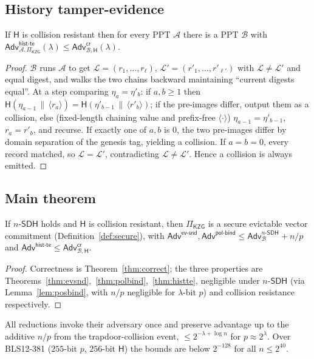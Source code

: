 \documentclass[version=submission]{iacrcc}
\theoremstyle{definition}
\newcommand{\secpar}{\lambda}
\newcommand{\PPT}{\mathrm{PPT}}
\newcommand{\concat}{\,\|\,}
\newcommand{\Adv}{\mathsf{Adv}}
\newcommand{\A}{\mathcal{A}}
\newcommand{\B}{\mathcal{B}}
\newcommand{\hash}{\mathsf{H}}
\newcommand{\Log}{\mathcal{L}}
\newcommand{\nsdh}{n\text{-}\mathsf{SDH}}
\newcommand{\evsnd}{\mathsf{ev\text{-}snd}}
\newcommand{\polbind}{\mathsf{pol\text{-}bind}}
\newcommand{\histte}{\mathsf{hist\text{-}te}}
\newcommand{\collres}{\mathsf{cr}}
\begin{document}
\subsection{History tamper-evidence}

\begin{theorem}\label{thm:histte}
If $\hash$ is collision resistant then for every $\PPT$ $\A$ there is a $\PPT$
$\B$ with $\Adv^{\histte}_{\A,\Pi_{\mathsf{KZG}}}(\secpar)\le
\Adv^{\collres}_{\B,\hash}(\secpar)$.
\end{theorem}
\begin{proof}
$\B$ runs $\A$ to get $\Log=(r_1,\dots,r_\ell)$, $\Log'=(r'_1,\dots,r'_{\ell'})$
with $\Log\neq\Log'$ and equal digest, and walks the two chains backward
maintaining ``current digests equal''. At a step comparing $\eta_a=\eta'_b$: if
$a,b\ge1$ then $\hash(\eta_{a-1}\concat\langle r_a\rangle)=\hash(\eta'_{b-1}
\concat\langle r'_b\rangle)$; if the pre-images differ, output them as a
collision, else (fixed-length chaining value and prefix-free $\langle\cdot
\rangle$) $\eta_{a-1}=\eta'_{b-1}$, $r_a=r'_b$, and recurse. If exactly one of
$a,b$ is $0$, the two pre-images differ by domain separation of the genesis tag,
yielding a collision. If $a=b=0$, every record matched, so $\Log=\Log'$,
contradicting $\Log\neq\Log'$. Hence a collision is always emitted.
\end{proof}

\subsection{Main theorem}

\begin{theorem}\label{thm:main}
If $\nsdh$ holds and $\hash$ is collision resistant, then $\Pi_{\mathsf{KZG}}$ is
a secure evictable vector commitment (Definition~\ref{def:secure}), with
$\Adv^{\evsnd},\Adv^{\polbind}\le\Adv^{\nsdh}_{\B}+n/p$ and
$\Adv^{\histte}\le\Adv^{\collres}_{\B,\hash}$.
\end{theorem}
\begin{proof}
Correctness is Theorem~\ref{thm:correct}; the three properties are
Theorems~\ref{thm:evsnd},~\ref{thm:polbind},~\ref{thm:histte}, negligible under
$\nsdh$ (via Lemma~\ref{lem:posbind}, with $n/p$ negligible for $\secpar$-bit
$p$) and collision resistance respectively.
\end{proof}

\begin{remark}
All reductions invoke their adversary once and preserve advantage up to the
additive $n/p$ from the trapdoor-collision event, $\le 2^{-\secpar+\log n}$ for
$p\approx2^{\secpar}$. Over BLS12-381 ($255$-bit $p$, $256$-bit $\hash$) the
bounds are below $2^{-128}$ for all $n\le2^{40}$.
\end{remark}
\end{document}
